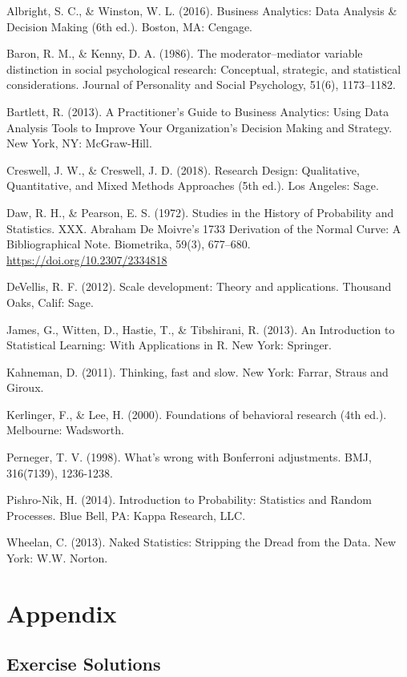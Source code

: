 \documentclass[]{book}
\begin{document}
Albright, S. C., \& Winston, W. L. (2016). Business Analytics: Data Analysis \& Decision Making (6th ed.). Boston, MA: Cengage.

Baron, R. M., \& Kenny, D. A. (1986). The moderator--mediator variable distinction in social psychological research: Conceptual, strategic, and statistical considerations. Journal of Personality and Social Psychology, 51(6), 1173--1182.

Bartlett, R. (2013). A Practitioner's Guide to Business Analytics: Using Data Analysis Tools to Improve Your Organization's Decision Making and Strategy. New York, NY: McGraw-Hill.

Creswell, J. W., \& Creswell, J. D. (2018). Research Design: Qualitative, Quantitative, and Mixed Methods Approaches (5th ed.). Los Angeles: Sage.

Daw, R. H., \& Pearson, E. S. (1972). Studies in the History of Probability and Statistics. XXX. Abraham De Moivre's 1733 Derivation of the Normal Curve: A Bibliographical Note. Biometrika, 59(3), 677--680. \url{https://doi.org/10.2307/2334818}

DeVellis, R. F. (2012). Scale development: Theory and applications. Thousand Oaks, Calif: Sage.

James, G., Witten, D., Hastie, T., \& Tibshirani, R. (2013). An Introduction to Statistical Learning: With Applications in R. New York: Springer.

Kahneman, D. (2011). Thinking, fast and slow. New York: Farrar, Straus and Giroux.

Kerlinger, F., \& Lee, H. (2000). Foundations of behavioral research (4th ed.). Melbourne: Wadsworth.

Perneger, T. V. (1998). What's wrong with Bonferroni adjustments. BMJ, 316(7139), 1236-1238.

Pishro-Nik, H. (2014). Introduction to Probability: Statistics and Random Processes. Blue Bell, PA: Kappa Research, LLC.

Wheelan, C. (2013). Naked Statistics: Stripping the Dread from the Data. New York: W.W. Norton.

\hypertarget{appendix}{%
\chapter{Appendix}\label{appendix}}

\hypertarget{exercise-solutions}{%
\section{Exercise Solutions}\label{exercise-solutions}}
\end{document}
